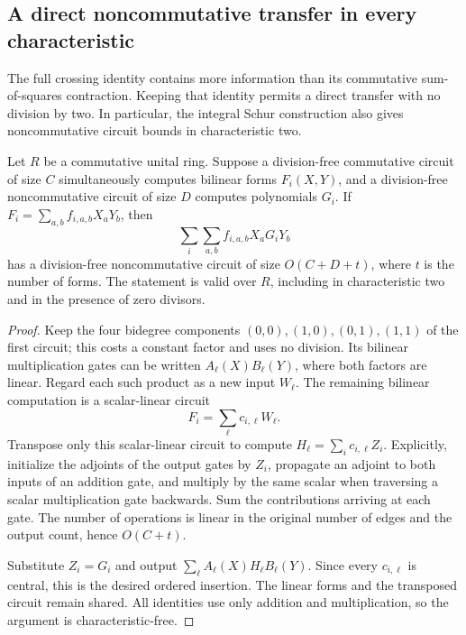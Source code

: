 \subsection{A direct noncommutative transfer in every characteristic}
\label{sec:direct-mixed-crossing}

The full crossing identity contains more information than its
commutative sum-of-squares contraction. Keeping that identity permits a
direct transfer with no division by two. In particular, the integral
Schur construction also gives noncommutative circuit bounds in
characteristic two.

\begin{lemma}
\label{lem:simultaneous-insertion}
Let $R$ be a commutative unital ring. Suppose a division-free
commutative circuit of size $C$ simultaneously computes bilinear forms
$F_i(X,Y)$, and a division-free noncommutative circuit of size $D$
computes polynomials $G_i$. If
$F_i=\sum_{a,b}f_{i,a,b}X_aY_b$, then
\[
 \sum_i\sum_{a,b}f_{i,a,b}X_aG_iY_b
\]
has a division-free noncommutative circuit of size $O(C+D+t)$, where
$t$ is the number of forms. The statement is valid over $R$, including
in characteristic two and in the presence of zero divisors.
\end{lemma}

\begin{proof}
Keep the four bidegree components $(0,0),(1,0),(0,1),(1,1)$ of the
first circuit; this costs a constant factor and uses no division.
Its bilinear multiplication gates can be written
$A_\ell(X)B_\ell(Y)$, where both factors are linear. Regard each such
product as a new input $W_\ell$. The remaining bilinear computation is
a scalar-linear circuit
\[
 F_i=\sum_\ell c_{i,\ell}W_\ell.
\]
Transpose only this scalar-linear circuit to compute
$H_\ell=\sum_i c_{i,\ell}Z_i$. Explicitly, initialize the adjoints of
the output gates by $Z_i$, propagate an adjoint to both inputs of an
addition gate, and multiply by the same scalar when traversing a scalar
multiplication gate backwards. Sum the contributions arriving at each
gate. The number of operations is linear in the original number of
edges and the output count, hence $O(C+t)$.

Substitute $Z_i=G_i$ and output
$\sum_\ell A_\ell(X)H_\ell B_\ell(Y)$. Since every $c_{i,\ell}$
is central, this is the desired ordered insertion. The linear forms
and the transposed circuit remain shared. All identities use only
addition and multiplication, so the argument is characteristic-free.
\end{proof}

